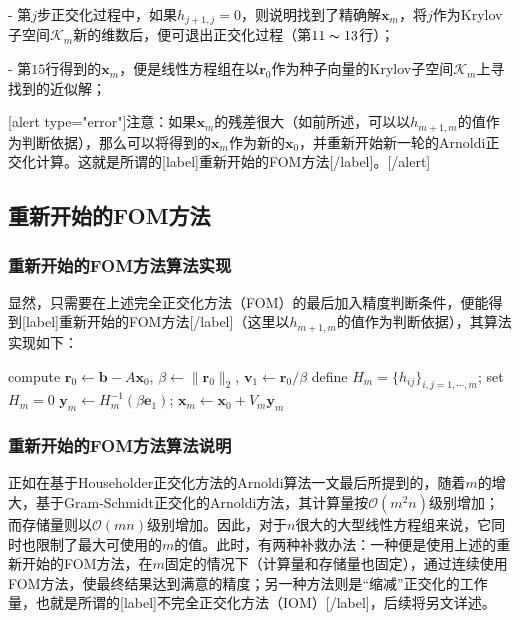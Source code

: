 \documentclass[UTF8,nofonts]{ctexart}
\begin{document}
- 第$j$步正交化过程中，如果$h_{j+1,j}=0$，则说明找到了精确解$\boldsymbol{x}_m$，将$j$作为Krylov子空间$\mathcal{K}_m$新的维数后，便可退出正交化过程（第$11\thicksim13$行）；

- 第$15$行得到的$\boldsymbol{x}_m$，便是线性方程组在以$\boldsymbol{r}_0$作为种子向量的Krylov子空间$\mathcal{K}_m$上寻找到的近似解；

[alert type="error"]注意：如果$\boldsymbol{x}_m$的残差很大（如前所述，可以以$h_{m+1,m}$的值作为判断依据），那么可以将得到的$\boldsymbol{x}_m$作为新的$\boldsymbol{x}_0$，并重新开始新一轮的Arnoldi正交化计算。这就是所谓的[label]重新开始的FOM方法[/label]。[/alert]

\subsection*{重新开始的FOM方法}

\subsubsection*{重新开始的FOM方法算法实现}

显然，只需要在上述完全正交化方法（FOM）的最后加入精度判断条件，便能得到[label]重新开始的FOM方法[/label]（这里以$h_{m+1,m}$的值作为判断依据），其算法实现如下：

\begin{algorithm}[H]
compute $\boldsymbol{r}_0\gets\boldsymbol{b}-A\boldsymbol{x}_0$, $\beta\gets\|\boldsymbol{r}_0\|_2$, $\boldsymbol{v}_1\gets\boldsymbol{r}_0/\beta$\;
define $H_m=\{h_{ij}\}_{i,j=1,\cdots,m}$; set $H_m=0$\;
$\boldsymbol{y}_m\gets H_m^{-1}(\beta\boldsymbol{e}_1)$; $\boldsymbol{x}_m\gets\boldsymbol{x}_0+V_m\boldsymbol{y}_m$\;
\end{algorithm}

\subsubsection*{重新开始的FOM方法算法说明}

正如在基于Householder正交化方法的Arnoldi算法一文最后所提到的，随着$m$的增大，基于Gram-Schmidt正交化的Arnoldi方法，其计算量按$\mathcal{O}(m^2n)$级别增加；而存储量则以$\mathcal{O}(mn)$级别增加。因此，对于$n$很大的大型线性方程组来说，它同时也限制了最大可使用的$m$的值。此时，有两种补救办法：一种便是使用上述的重新开始的FOM方法，在$m$固定的情况下（计算量和存储量也固定），通过连续使用FOM方法，使最终结果达到满意的精度；另一种方法则是“缩减”正交化的工作量，也就是所谓的[label]不完全正交化方法（IOM）[/label]，后续将另文详述。
\end{document}
